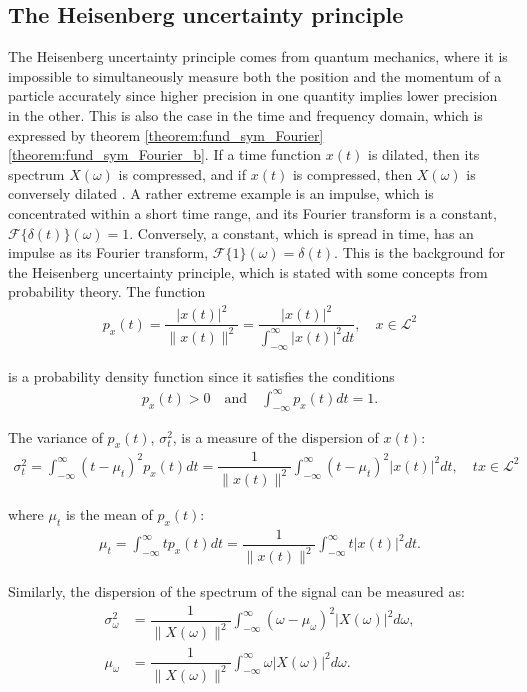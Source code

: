 \subsection{The Heisenberg uncertainty principle}\label{sec:heisenberg}
The Heisenberg uncertainty principle comes from quantum mechanics, where it is impossible to simultaneously measure both the position and the momentum of a particle accurately since higher precision in one quantity implies lower precision in the other. This is also the case in the time and frequency domain, which is expressed by theorem \ref{theorem:fund_sym_Fourier}  \ref{theorem:fund_sym_Fourier_b}. If a time function $x(t)$ is dilated, then its spectrum $X(\omega)$ is compressed, and if $x(t)$ is compressed, then $X(\omega)$ is conversely dilated \cite{page 135, Wang}. A rather extreme example is an impulse, which is concentrated within a short time range, and its Fourier transform is a constant, $\mathcal{F}\{\delta(t)\}(\omega) = 1$. Conversely, a constant, which is spread in time, has an impulse as its Fourier transform, $\mathcal{F}\{1\}(\omega) = \delta(t)$. This is the background for the Heisenberg uncertainty principle, which is stated with some concepts from probability theory. The function 
\begin{align*}
p_x(t) = \dfrac{|x(t)|^2}{\|x(t)\|^2} = \dfrac{|x(t)|^2}{\int_{-\infty}^\infty |x(t)|^2 dt}, \quad x \in \mathcal{L}^2
\end{align*}

is a probability density function since it satisfies the conditions
\begin{align*}
p_x(t) > 0 \quad \text{and} \quad \int_{-\infty}^\infty p_x(t) dt = 1.
\end{align*}

The variance of $p_x(t)$, $\sigma_t^2$, is a measure of the dispersion of $x(t)$:
\begin{align*}
\sigma_t^2 = \int_{-\infty}^\infty (t - \mu_t)^2 p_x(t) dt = \dfrac{1}{\|x(t)\|^2} \int_{-\infty}^\infty (t - \mu_t)^2 |x(t)|^2 dt, \quad tx \in \mathcal{L}^2
\end{align*}

where $\mu_t$ is the mean of $p_x(t)$:
\begin{align*}
\mu_t = \int_{-\infty}^\infty t p_x(t) dt = \dfrac{1}{\|x(t)\|^2} \int_{-\infty}^\infty t |x(t)|^2 dt.
\end{align*}

Similarly, the dispersion of the spectrum of the signal can be measured as:
\begin{align*}
\sigma_\omega^2 &= \dfrac{1}{\|X(\omega)\|^2} \int_{-\infty}^\infty (\omega - \mu_\omega)^2 |X(\omega)|^2 d\omega, \\
\mu_\omega &= \dfrac{1}{\|X(\omega)\|^2} \int_{-\infty}^\infty \omega |X(\omega)|^2 d\omega.
\end{align*}

